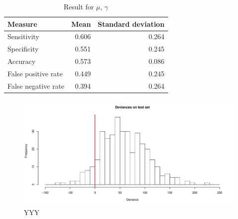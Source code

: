 \begin{table}\caption{Result for $\mu$, $\gamma$}\label{table:correlated-no-intercept-mu}
\begin{tabular}{l|rr}
Measure     & Mean   & Standard deviation     \\
\hline
Sensitivity &  0.606 & 0.264 \\
Specificity &  0.551 & 0.245 \\
Accuracy    &  0.573 & 0.086 \\
False positive rate         &  0.449 & 0.245 \\
False negative rate         &  0.394 & 0.264
\end{tabular}
\end{table}

\begin{figure}
\caption{YYY}
\centering\includegraphics[scale=0.4]{figures/correlated_non-cyclic-no-intercept_cv_deviance.pdf}
\end{figure}